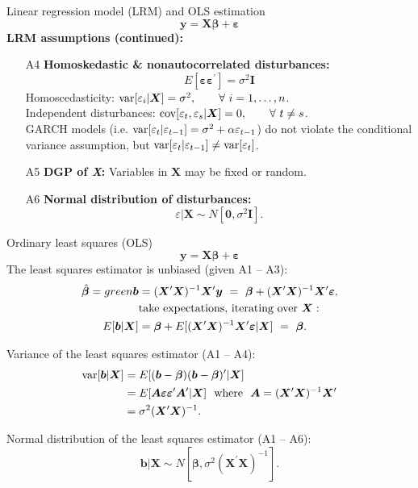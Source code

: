 \documentclass{beamer}
\begin{document}
\begin{frame}{Linear regression model (LRM) and OLS estimation}
$$
\bm{y} = \bm{X\beta} + \bm{\varepsilon}
$$
\textbf{LRM assumptions (continued):}
\medskip
\begin{enumerate}
    \item[A4] \textbf{Homoskedastic \& nonautocorrelated disturbances:}$$E[\bm{\varepsilon\varepsilon}^{\prime}]=\sigma^2\bm{I}$$ Homoscedasticity: $\textnormal{var}[\varepsilon_i|\bm{X}]=\sigma^2, \qquad \forall~i=1,\dots,n$.\\Independent disturbances: $\textnormal{cov}[\varepsilon_t,\varepsilon_s|\bm{X}]=0, \qquad \forall~t \neq s$.\\ \smallskip GARCH models (i.e. $\textnormal{var}[\varepsilon_t|\varepsilon_{t-1}]=\sigma^2+\alpha \varepsilon_{t-1}$) do not violate the conditional variance assumption, but $\textnormal{var}[\varepsilon_t|\varepsilon_{t-1}] \neq \textnormal{var}[\varepsilon_t]$.
    \item[A5] \textbf{DGP of \textit{X}:} Variables in $\bm{X}$ may be fixed or random.
    \item[A6] \textbf{Normal distribution of disturbances:} $$\varepsilon | \bm{X} \sim N[\bm{0}, \sigma^2\bm{I}].$$
\end{enumerate}
\end{frame}
\begin{frame}{Ordinary least squares (OLS)}
\vspace{-0.3cm}
$$
\bm{y} = \bm{X\beta} + \bm{\varepsilon}
$$
\medskip
The least squares estimator is unbiased (given A1 -- A3):
\begin{align*}
    \hat{\bm{\beta}}=green\bm{b}&=(\bm{X}^{\prime}\bm{X})^{-1} \bm{X}^{\prime}\bm{y}~=~\bm{\beta}+(\bm{X}^{\prime}\bm{X})^{-1} \bm{X}^{\prime}\bm{\varepsilon}, \\
    &\textnormal{take expectations, iterating over}~\bm{X}:\\
    E[\bm{b}|\bm{X}]&= \bm{\beta}+E[(\bm{X}^{\prime}\bm{X})^{-1} \bm{X}^{\prime}\bm{\varepsilon}|\bm{X}]~=~\bm{\beta}.\\
\end{align*}

Variance of the least squares estimator (A1 -- A4):
\begin{align*}
    \textnormal{var}[\bm{b}|\bm{X}]&=E[(\bm{b}-\bm{\beta})(\bm{b}-\bm{\beta})^{\prime}|\bm{X}]\\
    &=E[\bm{A \varepsilon \varepsilon}^{\prime}\bm{A}^{\prime}|\bm{X}] \textnormal{~~where~~}\bm{A}=(\bm{X}^{\prime}\bm{X})^{-1} \bm{X}^{\prime}\\
    &= \sigma^2 (\bm{X}^{\prime}\bm{X})^{-1}.\\
\end{align*}

Normal distribution of the least squares estimator (A1 -- A6):
$$\bm{b} | \bm{X} \sim N[\bm{\beta}, \sigma^2(\bm{X}^{\prime}\bm{X})^{-1}].$$
    
\end{frame}
\end{document}
